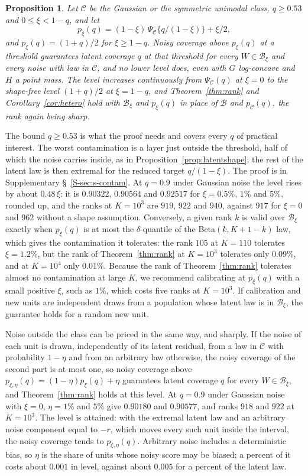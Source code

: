 \documentclass[12pt]{article}
\newtheorem{proposition}{Proposition}
\theoremstyle{definition}
\newcommand{\B}{\mathcal{B}}
\newcommand{\E}{\mathcal{C}}
\begin{document}
\begin{proposition}\label{prop:contam}
Let $\E$ be the Gaussian or the symmetric unimodal class, $q \ge 0.53$ and $0 \le \xi < 1 - q$, and let
\[
p_\xi(q) = (1 - \xi)\,\Psi_{\E}\{q/(1 - \xi)\} + \xi/2,
\]
and $p_\xi(q) = (1 + q)/2$ for $\xi \ge 1 - q$. Noisy coverage above $p_\xi(q)$ at a threshold guarantees latent coverage $q$ at that threshold for every $W \in \B_\xi$ and every noise with law in $\E$, and no lower level does, even with $G$ log-concave and $H$ a point mass. The level increases continuously from $\Psi_{\E}(q)$ at $\xi = 0$ to the shape-free level $(1 + q)/2$ at $\xi = 1 - q$, and Theorem~\ref{thm:rank} and Corollary~\ref{cor:hetero} hold with $\B_\xi$ and $p_\xi(q)$ in place of $\B$ and $p_{\E}(q)$, the rank again being sharp.
\end{proposition}

The bound $q \ge 0.53$ is what the proof needs and covers every $q$ of practical interest. The worst contamination is a layer just outside the threshold, half of which the noise carries inside, as in Proposition~\ref{prop:latentshape}; the rest of the latent law is then extremal for the reduced target $q/(1 - \xi)$. The proof is in Supplementary \S~\ref{S-sec:s-contam}. At $q = 0.9$ under Gaussian noise the level rises by about $0.48\,\xi$: it is $0.90322$, $0.90564$ and $0.92517$ for $\xi = 0.5\%$, $1\%$ and $5\%$, rounded up, and the ranks at $K = 10^3$ are $919$, $922$ and $940$, against $917$ for $\xi = 0$ and $962$ without a shape assumption. Conversely, a given rank $k$ is valid over $\B_\xi$ exactly when $p_\xi(q)$ is at most the $\delta$-quantile of the Beta$(k, K + 1 - k)$ law, which gives the contamination it tolerates: the rank $105$ at $K = 110$ tolerates $\xi = 1.2\%$, but the rank of Theorem~\ref{thm:rank} at $K = 10^3$ tolerates only $0.09\%$, and at $K = 10^4$ only $0.01\%$. Because the rank of Theorem~\ref{thm:rank} tolerates almost no contamination at large $K$, we recommend calibrating at $p_\xi(q)$ with a small positive $\xi$, such as $1\%$, which costs five ranks at $K = 10^3$. If calibration and new units are independent draws from a population whose latent law is in $\B_\xi$, the guarantee holds for a random new unit.

Noise outside the class can be priced in the same way, and sharply. If the noise of each unit is drawn, independently of its latent residual, from a law in $\E$ with probability $1 - \eta$ and from an arbitrary law otherwise, the noisy coverage of the second part is at most one, so noisy coverage above $p_{\xi,\eta}(q) = (1 - \eta)p_\xi(q) + \eta$ guarantees latent coverage $q$ for every $W \in \B_\xi$, and Theorem~\ref{thm:rank} holds at this level. At $q = 0.9$ under Gaussian noise with $\xi = 0$, $\eta = 1\%$ and $5\%$ give $0.90180$ and $0.90577$, and ranks $918$ and $922$ at $K = 10^3$. The level is attained: with the extremal latent law and an arbitrary noise component equal to $-r$, which moves every such unit inside the interval, the noisy coverage tends to $p_{\xi,\eta}(q)$. Arbitrary noise includes a deterministic bias, so $\eta$ is the share of units whose noisy score may be biased; a percent of it costs about $0.001$ in level, against about $0.005$ for a percent of the latent law.
\end{document}
